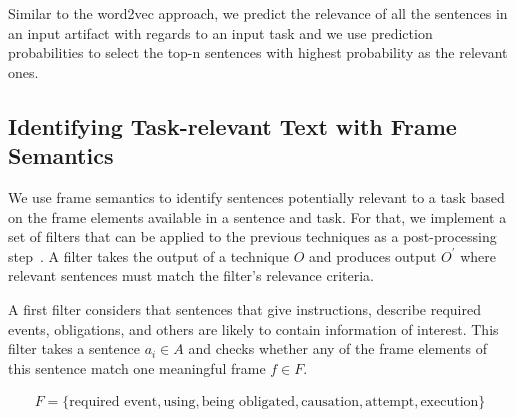 Similar to the word2vec approach, we predict the relevance of all the sentences in an input artifact with regards to an input task and we use prediction probabilities to select 
the top-n sentences with highest probability as the relevant ones.









\subsection{Identifying Task-relevant Text with Frame Semantics}
\label{cp5:approach-filters}




We use frame semantics to identify sentences potentially relevant to a task based on the frame elements available in a sentence and task. 
For that, we implement a set of filters that can be applied to the previous techniques as a post-processing step~\cite{Manning2009IR}.
A filter takes the output of a technique $O$ and produces output $O^{\prime}$ where relevant sentences must match the filter's relevance criteria.


A first filter considers that sentences that give instructions, describe required events, obligations, and others are likely to contain information of interest. 
This filter takes a sentence $a_i \in A$ and checks whether any of the frame elements of this sentence match one meaningful frame $f \in F$. 





\begin{equation}
\begin{split}
F = \{ \text{required event}, \text{using}, \text{being obligated}, \text{causation}, \text{attempt}, \text{execution} \} 
\end{split}
\end{equation}





